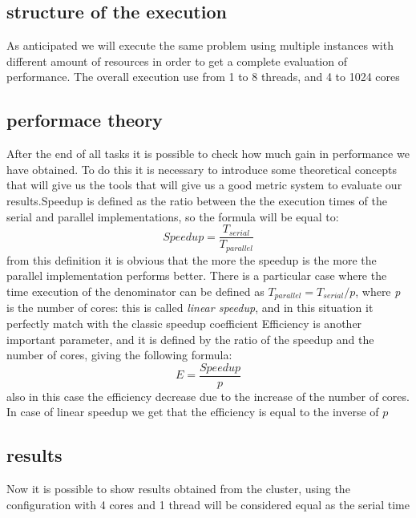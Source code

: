 \documentclass[10pt]{article}
\begin{document}
\begin{multicols}{2}
\subsection*{structure of the execution}

As anticipated we will execute the same problem using multiple instances with different amount of
resources in order to get a complete evaluation of performance. The overall execution use from 1 to 8
threads, and 4 to 1024 cores

\subsection*{performace theory}

After the end of all tasks it is possible to check how much gain in performance we have obtained.
To do this it is necessary to introduce some theoretical concepts that will give us the tools that
will give us a good metric system to evaluate our results.Speedup is defined as the ratio between the the execution times of the serial and parallel
implementations, so the formula will be equal to: $$Speedup = \frac{T_{serial}}{T_{parallel}}$$ 
from this definition it is obvious that the more the speedup is the more the parallel implementation
performs better. There is a particular case where the time execution of the denominator can be defined
as $T_{parallel}=T_{serial}/p$, where \textit{p} is the number of cores: this is called \textit{linear speedup},
and in this situation it perfectly match with the classic speedup coefficient
Efficiency is another important parameter, and it is defined by the ratio of the speedup and the 
number of cores, giving the following formula: $$E = \frac{Speedup}{p}$$
also in this case the efficiency decrease due to the increase of the number of cores. In case
of linear speedup we get that the efficiency is equal to the inverse of $p$
\subsection*{results}
Now it is possible to show results obtained from the cluster,
using the configuration with 4 cores and 1 thread will be considered
equal as the serial time
\newline


\end{multicols}
\end{document}
